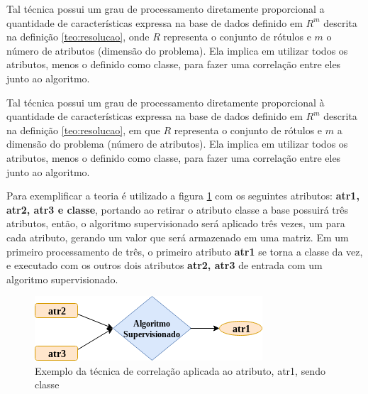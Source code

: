 Tal técnica possui um grau de processamento diretamente proporcional a quantidade de características expressa na base de dados definido em ${R^m}$ descrita na definição \ref{teo:resolucao}, onde ${R}$ representa o conjunto de rótulos e ${m}$ o número de atributos (dimensão do problema). Ela implica em utilizar todos os atributos, menos o definido como classe, para fazer uma correlação entre eles junto ao algoritmo.

Tal técnica possui um grau de processamento diretamente proporcional à quantidade de características expressa na base de dados definido em ${R^m}$ descrita na definição  \ref{teo:resolucao}, em que ${R}$ representa o conjunto de rótulos e ${m}$ a dimensão do problema (número de atributos). Ela implica em utilizar todos os atributos, menos o definido como classe, para fazer uma correlação entre eles junto ao algoritmo. 


Para exemplificar a teoria é utilizado a figura \ref{fig:tecnicamodelo} com os seguintes atributos: \textbf{atr1, atr2, atr3 e classe}, portando ao retirar o atributo classe a base possuirá três atributos, então, o algoritmo supervisionado será aplicado três vezes, um para cada atributo, gerando um valor que será armazenado em uma matriz. Em um primeiro processamento de três, o primeiro atributo \textbf{atr1} se torna a classe da vez, e executado com os outros dois atributos \textbf{atr2, atr3} de entrada com um algoritmo supervisionado.

\begin{figure}[h!]
        \centering
        \includegraphics[scale=0.7]{figs/tecnicamodelo.png}
        \caption{Exemplo da técnica de correlação aplicada ao atributo, atr1, sendo classe } \label{fig:tecnicamodelo}
\end{figure}


